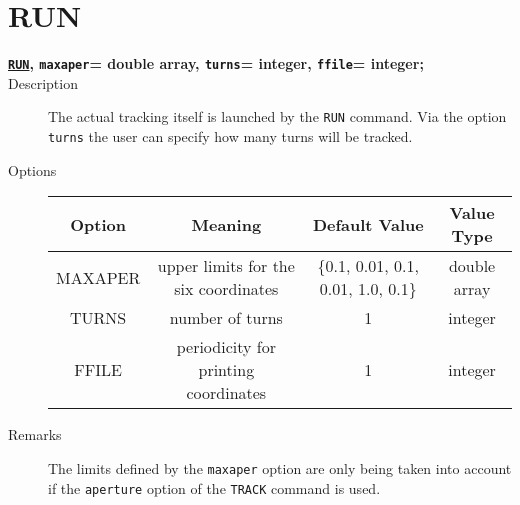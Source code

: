 \section{RUN}
\begin{description}
   \item[\textbf{\texttt{\href{run}{RUN}}, \texttt{maxaper}= double array, \texttt{turns}= integer, \texttt{ffile}= integer;}] 
  
   \item[Description] 
     The actual tracking itself is launched by the \texttt{RUN} command. Via the option 
     \texttt{turns} the user can specify how many turns will be tracked.
     
   \item[Options] 
     \text{ \\}	
     
     \begin{tabular}{cccc}
       \hline 
       \textbf{Option} & \textbf{Meaning} & \textbf{Default Value} & \textbf{Value Type} \\ 
       \hline
       MAXAPER & upper limits for the six coordinates & \{0.1, 0.01, 0.1, 0.01, 1.0, 0.1\} & double array \\ 
       \hline
       TURNS & number of turns  & 1 & integer \\ 
       \hline
       FFILE & periodicity for printing coordinates  & 1 & integer \\ 
       \hline
       
     \end{tabular}
   \item[Remarks] 
     The limits defined by the \texttt{maxaper} option are only being taken into account if the 
     \texttt{aperture} option of the \texttt{TRACK} command is used.
     
\end{description}

